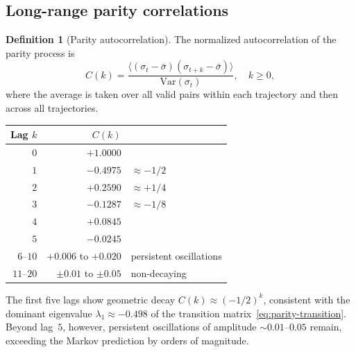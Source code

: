 \documentclass[11pt,a4paper]{article}
\theoremstyle{plain}
\theoremstyle{definition}
\newtheorem{definition}[theorem]{Definition}
\begin{document}
\subsection{Long-range parity correlations}

\begin{definition}[Parity autocorrelation]
    The normalized autocorrelation of the parity process is
    \begin{equation}
        C(k) = \frac{\langle (\sigma_t - \bar{\sigma})
        (\sigma_{t+k} - \bar{\sigma}) \rangle}
        {\mathrm{Var}(\sigma_t)}, \quad k \geq 0,
    \end{equation}
    where the average is taken over all valid pairs within each
    trajectory and then across all trajectories.
\end{definition}

\begin{empirical}
\label{obs:parity-autocorr}
    \begin{center}
    \renewcommand{\arraystretch}{1.15}
    \begin{tabular}{rrl}
        \toprule
        Lag $k$ & $C(k)$ & \\
        \midrule
        $0$ & $+1.0000$ & \\
        $1$ & $-0.4975$ & $\approx -1/2$ \\
        $2$ & $+0.2590$ & $\approx +1/4$ \\
        $3$ & $-0.1287$ & $\approx -1/8$ \\
        $4$ & $+0.0845$ & \\
        $5$ & $-0.0245$ & \\
        $6$--$10$ & $+0.006$ to $+0.020$ &
            persistent oscillations \\
        $11$--$20$ & $\pm 0.01$ to $\pm 0.05$ &
            non-decaying \\
        \bottomrule
    \end{tabular}
    \end{center}
    The first five lags show geometric decay
    $C(k) \approx (-1/2)^k$, consistent with the dominant
    eigenvalue $\lambda_1 \approx -0.498$ of the transition
    matrix~\eqref{eq:parity-transition}.  Beyond lag~$5$, however,
    persistent oscillations of amplitude $\sim 0.01$--$0.05$
    remain, exceeding the Markov prediction by orders of
    magnitude.
\end{empirical}
\end{document}
